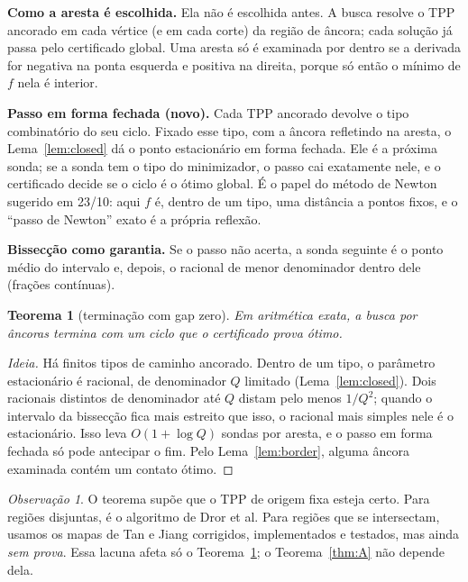 \documentclass[11pt]{article}
\theoremstyle{plain}
\newtheorem{teorema}{Teorema}
\theoremstyle{remark}
\newtheorem*{obs}{Observação}
\newcommand{\sect}[1]{\par\bigskip{\color{navy}\large\bfseries #1\par}\smallskip}
\begin{document}
\textbf{Como a aresta é escolhida.} Ela não é escolhida antes. A busca resolve o TPP
ancorado em cada vértice (e em cada corte) da região de âncora; cada solução já passa
pelo certificado global. Uma aresta só é examinada por dentro se a derivada for negativa
na ponta esquerda e positiva na direita, porque só então o mínimo de $f$ nela é interior.

\textbf{Passo em forma fechada (novo).} Cada TPP ancorado devolve o tipo combinatório
do seu ciclo. Fixado esse tipo, com a âncora refletindo na aresta, o
Lema~\ref{lem:closed} dá o ponto estacionário em forma fechada. Ele é a próxima sonda; se
a sonda tem o tipo do minimizador, o passo cai exatamente nele, e o certificado decide se
o ciclo é o ótimo global. É o papel do método de Newton sugerido em 23/10: aqui $f$ é,
dentro de um tipo, uma distância a pontos fixos, e o ``passo de Newton'' exato é a própria
reflexão.

\textbf{Bissecção como garantia.} Se o passo não acerta, a sonda seguinte é o ponto médio
do intervalo e, depois, o racional de menor denominador dentro dele (frações contínuas).

\begin{teorema}[terminação com gap zero]\label{thm:B}
Em aritmética exata, a busca por âncoras termina com um ciclo que o certificado prova
ótimo.
\end{teorema}
\begin{proof}[Ideia]
Há finitos tipos de caminho ancorado. Dentro de um tipo, o parâmetro estacionário é
racional, de denominador $Q$ limitado (Lema~\ref{lem:closed}). Dois racionais distintos
de denominador até $Q$ distam pelo menos $1/Q^2$; quando o intervalo da bissecção fica
mais estreito que isso, o racional mais simples nele é o estacionário. Isso leva
$O(1+\log Q)$ sondas por aresta, e o passo em forma fechada só pode antecipar o fim.
Pelo Lema~\ref{lem:border}, alguma âncora examinada contém um contato ótimo.
\end{proof}

\begin{obs}
O teorema supõe que o TPP de origem fixa esteja certo. Para regiões disjuntas, é o
algoritmo de Dror et al. Para regiões que se intersectam, usamos os mapas de Tan e Jiang
corrigidos, implementados e testados, mas ainda \emph{sem prova}. Essa lacuna afeta só o
Teorema~\ref{thm:B}; o Teorema~\ref{thm:A} não depende dela.
\end{obs}

\sect{5. Quantas sondas, na prática}
\end{document}
